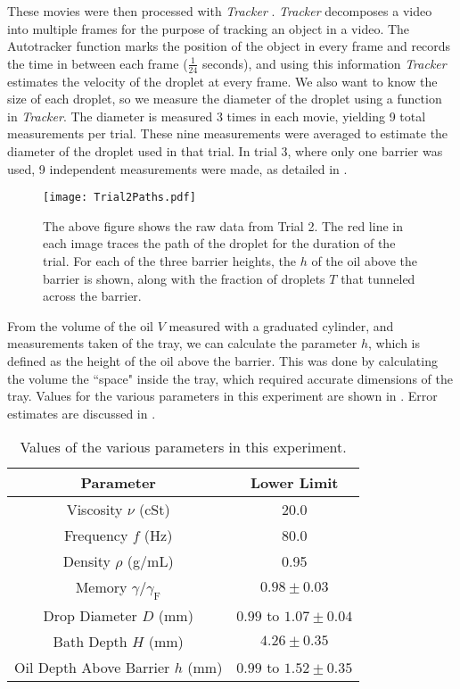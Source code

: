These movies were then processed with \textit{Tracker} \cite{tracker}. \textit{Tracker} decomposes a video into multiple frames for the purpose of tracking an object in a video. The Autotracker function marks the position of the object in every frame and records the time in between each frame ($\frac{1}{24}$ seconds), and using this information \textit{Tracker} estimates the velocity of the droplet at every frame. We also want to know the size of each droplet, so we measure the diameter of the droplet using a function in \textit{Tracker}. The diameter is measured 3 times in each movie, yielding 9 total measurements per trial. These nine measurements were averaged to estimate the diameter of the droplet used in that trial. In trial 3, where only one barrier was used, 9 independent measurements were made, as detailed in .

\begin{figure}[h!]
	\centering
	\texttt{[image: Trial2Paths.pdf]}
	\caption{The above figure shows the raw data from Trial 2. The red line in each image traces the path of the droplet for the duration of the trial. For each of the three barrier heights, the $h$ of the oil above the barrier is shown, along with the fraction of droplets $T$ that tunneled across the barrier. }
	\label{trialex}
\end{figure}

From the volume of the oil $V$ measured with a graduated cylinder, and measurements taken of the tray, we can calculate the parameter $h$, which is defined as the height of the oil above the barrier. This was done by calculating the volume the ``space" inside the tray, which required accurate dimensions of the tray. Values for the various parameters in this experiment are shown in . Error estimates are discussed in .%



	       \begin{table}[htdp] 
\caption[Basic Table 1]{Values of the various parameters in this experiment.} 
\begin{center} 
\begin{tabular}{c c} 
\toprule 
  Parameter &  Lower Limit\\
  \midrule
Viscosity $\nu$ (cSt) & 20.0 \\ 
Frequency $f$ (Hz) & 80.0 \\
Density $\rho$ (g/mL) & 0.95\\
Memory $\gamma/\gamma_\mathrm{F}$ & $0.98 \pm 0.03 $ \\
Drop Diameter $D$ (mm) & $0.99$ to $1.07 \pm 0.04$ \\
Bath Depth $H$ (mm) & $4.26 \pm 0.35$ \\
Oil Depth Above Barrier $h$ (mm) & $0.99$ to $1.52 \pm 0.35$ \\ 
\bottomrule 
\end{tabular}
\end{center}
\label{explimits} 
\end{table}	


